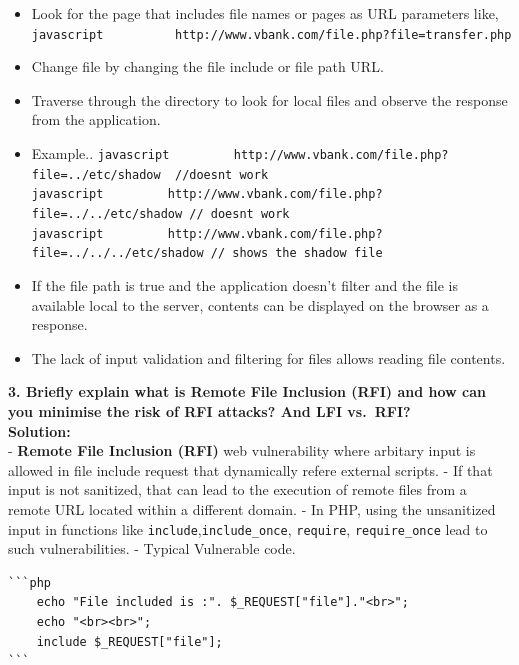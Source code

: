 \begin{itemize}
\item
  Look for the page that includes file names or pages as URL parameters
  like,
  \texttt{javascript\ \ \ \ \ \ \ \ \ \ http://www.vbank.com/file.php?file=transfer.php}
\item
  Change file by changing the file include or file path URL.
\item
  Traverse through the directory to look for local files and observe the
  response from the application.
\item
  Example..
  \texttt{javascript\ \ \ \ \ \ \ \ \ http://www.vbank.com/file.php?file=../etc/shadow\ \ //does\textquotesingle{}nt\ work}
  \texttt{javascript\ \ \ \ \ \ \ \ \ http://www.vbank.com/file.php?file=../../etc/shadow\ //\ does\textquotesingle{}nt\ work}
  \texttt{javascript\ \ \ \ \ \ \ \ \ http://www.vbank.com/file.php?file=../../../etc/shadow\ //\ shows\ the\ shadow\ file}
\item
  If the file path is true and the application doesn't filter and the
  file is available local to the server, contents can be displayed on
  the browser as a response.
\item
  The lack of input validation and filtering for files allows reading
  file contents.
\end{itemize}

\textbf{3. Briefly explain what is Remote File Inclusion (RFI) and how
can you minimise the risk of RFI attacks? And LFI vs.~RFI?}\\
\textbf{Solution:}\\
- \textbf{Remote File Inclusion (RFI)} web vulnerability where arbitary
input is allowed in file include request that dynamically refere
external scripts. - If that input is not sanitized, that can lead to the
execution of remote files from a remote URL located within a different
domain. - In PHP, using the unsanitized input in functions like
\texttt{include},\texttt{include\_once}, \texttt{require},
\texttt{require\_once} lead to such vulnerabilities. - Typical
Vulnerable code.

\begin{verbatim}
```php
    echo "File included is :". $_REQUEST["file"]."<br>";
    echo "<br><br>";
    include $_REQUEST["file"];
```
\end{verbatim}

